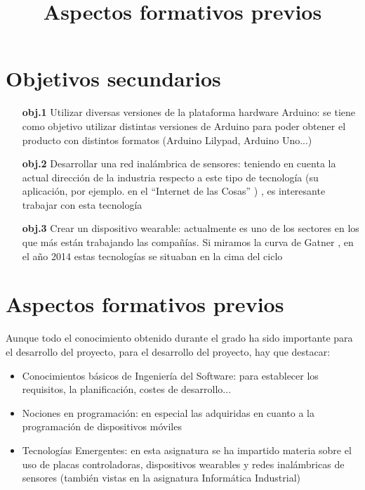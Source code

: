 \section{
Objetivos secundarios
}
  \begin{itemize}
    \item[\textbf{obj.1}]Utilizar diversas versiones de la plataforma hardware Arduino: se tiene como objetivo utilizar distintas versiones de Arduino para poder obtener el producto con distintos formatos (Arduino Lilypad, Arduino Uno...)
    \item[\textbf{obj.2}]Desarrollar una red inalámbrica de sensores: teniendo en cuenta la actual dirección de la industria respecto a este tipo de tecnología (su aplicación, por ejemplo. en el “Internet de las Cosas” \cite{hypeIoT} \cite{gatnercurve}) , es interesante trabajar con esta tecnología
    \item[\textbf{obj.3}]Crear un dispositivo wearable: actualmente es uno de los sectores en los que más están trabajando las compañías. Si miramos la curva de Gatner \cite{gatnercurve}, en el año 2014 estas tecnologías se situaban en la cima del ciclo
  \end{itemize}

\title{Aspectos formativos previos}
\section{
Aspectos formativos previos
}

Aunque todo el conocimiento obtenido durante el grado ha sido importante para el desarrollo del proyecto, para el desarrollo del proyecto, hay que destacar:

  \begin{itemize}
    \item Conocimientos básicos de Ingeniería del Software: para establecer los requisitos, la planificación, costes de desarrollo...
    \item Nociones en programación: en especial las adquiridas en cuanto a la programación de dispositivos móviles
    \item Tecnologías Emergentes: en esta asignatura se ha impartido materia sobre el uso de placas controladoras, dispositivos wearables y redes inalámbricas de sensores (también vistas en la asignatura Informática Industrial)
  \end{itemize}

